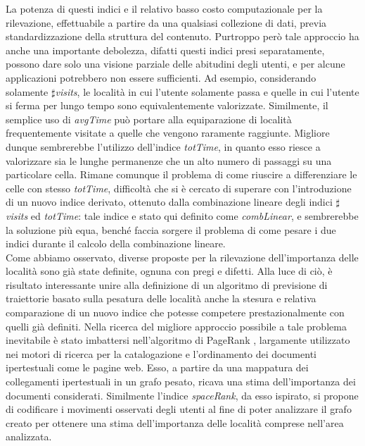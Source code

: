 La potenza di questi indici e il relativo basso costo computazionale per la rilevazione,
effettuabile a partire da una qualsiasi collezione di dati, previa standardizzazione
della struttura del contenuto. Purtroppo per\`o tale approccio
ha anche una importante debolezza, difatti questi indici presi separatamente,
possono dare solo una visione parziale delle abitudini degli utenti, e per alcune
applicazioni potrebbero non essere sufficienti. Ad esempio, considerando solamente
$\sharp$\textit{visits}, le localit\`a in cui l'utente solamente passa e quelle in cui l'utente
si ferma per lungo tempo sono equivalentemente valorizzate. Similmente, il
semplice uso di \textit{avgTime} pu\`o portare alla equiparazione di localit\`a frequentemente
visitate a quelle che vengono raramente raggiunte. Migliore dunque
sembrerebbe l'utilizzo dell'indice \textit{totTime}, in quanto esso riesce a valorizzare
sia le lunghe permanenze che un alto numero di passaggi su una particolare
cella. Rimane comunque il problema di come riuscire a differenziare le celle con
stesso \textit{totTime}, difficolt\`a che si \`e cercato di superare con l'introduzione di un
nuovo indice derivato, ottenuto dalla combinazione lineare degli indici $\sharp$\textit{visits}
ed \textit{totTime}: tale indice e stato qui definito come \textit{combLinear}, e sembrerebbe
la soluzione pi\`u equa, bench\'e faccia sorgere il problema di come pesare i due
indici durante il calcolo della combinazione lineare.\\
Come abbiamo osservato, diverse proposte per la rilevazione dell'importanza
delle localit\`a sono gi\`a state definite, ognuna con pregi e difetti. Alla
luce di ci\`o, \`e risultato interessante unire alla definizione di un algoritmo di
previsione di traiettorie basato sulla pesatura delle localit\`a anche la stesura e
relativa comparazione di un nuovo indice che potesse competere prestazionalmente
con quelli gi\`a definiti. Nella ricerca del migliore approccio possibile a
tale problema inevitabile \`e stato imbattersi nell'algoritmo di PageRank \cite{cit_45},
largamente utilizzato nei motori di ricerca per la catalogazione e l'ordinamento
dei documenti ipertestuali come le pagine web. Esso, a partire da una
mappatura dei collegamenti ipertestuali in un grafo pesato, ricava una stima
dell'importanza dei documenti considerati. Similmente l'indice \textit{spaceRank}, da
esso ispirato, si propone di codificare i movimenti osservati degli utenti al fine
di poter analizzare il grafo creato per ottenere una stima dell'importanza delle
localit\`a comprese nell'area analizzata.

